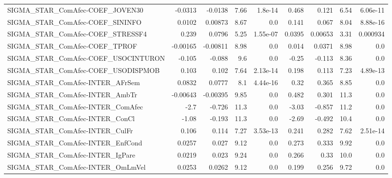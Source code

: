 \begin{tabular}{lrrrrrrrr}
SIGMA\_STAR\_ComAfec-COEF\_JOVEN30        &     -0.0313 &      -0.0138 &     7.66 &  1.8e-14 &      0.468 &       0.121 &         6.54 &      6.06e-11 \\
SIGMA\_STAR\_ComAfec-COEF\_SININFO        &      0.0102 &      0.00873 &     8.67 &      0.0 &      0.141 &       0.067 &         8.04 &      8.88e-16 \\
SIGMA\_STAR\_ComAfec-COEF\_STRESSF4       &       0.239 &       0.0796 &     5.25 & 1.55e-07 &     0.0395 &     0.00653 &         3.31 &      0.000934 \\
SIGMA\_STAR\_ComAfec-COEF\_TPROF          &    -0.00165 &     -0.00811 &     8.98 &      0.0 &      0.014 &      0.0371 &         8.98 &           0.0 \\
SIGMA\_STAR\_ComAfec-COEF\_USOCINTURON    &      -0.105 &       -0.088 &      9.6 &      0.0 &      -0.25 &      -0.113 &         8.36 &           0.0 \\
SIGMA\_STAR\_ComAfec-COEF\_USODISPMOB     &       0.103 &        0.102 &     7.64 & 2.13e-14 &      0.198 &       0.113 &         7.23 &      4.89e-13 \\
SIGMA\_STAR\_ComAfec-INTER\_AFrSem        &      0.0832 &       0.0777 &      8.1 & 4.44e-16 &       0.32 &       0.365 &         8.85 &           0.0 \\
SIGMA\_STAR\_ComAfec-INTER\_AmbTr         &    -0.00643 &     -0.00395 &     9.85 &      0.0 &      0.482 &       0.301 &         11.3 &           0.0 \\
SIGMA\_STAR\_ComAfec-INTER\_ComAfec       &        -2.7 &       -0.726 &     11.3 &      0.0 &      -3.03 &      -0.857 &         11.2 &           0.0 \\
SIGMA\_STAR\_ComAfec-INTER\_ConCl         &       -1.08 &       -0.193 &     11.3 &      0.0 &      -2.69 &      -0.492 &         10.4 &           0.0 \\
SIGMA\_STAR\_ComAfec-INTER\_CulFr         &       0.106 &        0.114 &     7.27 & 3.53e-13 &      0.241 &       0.282 &         7.62 &      2.51e-14 \\
SIGMA\_STAR\_ComAfec-INTER\_EnfCond       &      0.0257 &        0.027 &     9.12 &      0.0 &      0.273 &       0.333 &         9.92 &           0.0 \\
SIGMA\_STAR\_ComAfec-INTER\_IgPare        &      0.0219 &        0.023 &     9.24 &      0.0 &      0.266 &        0.33 &         10.0 &           0.0 \\
SIGMA\_STAR\_ComAfec-INTER\_OmLmVel       &      0.0253 &       0.0262 &     9.12 &      0.0 &      0.199 &       0.256 &         9.72 &           0.0 \\

\end{tabular}
